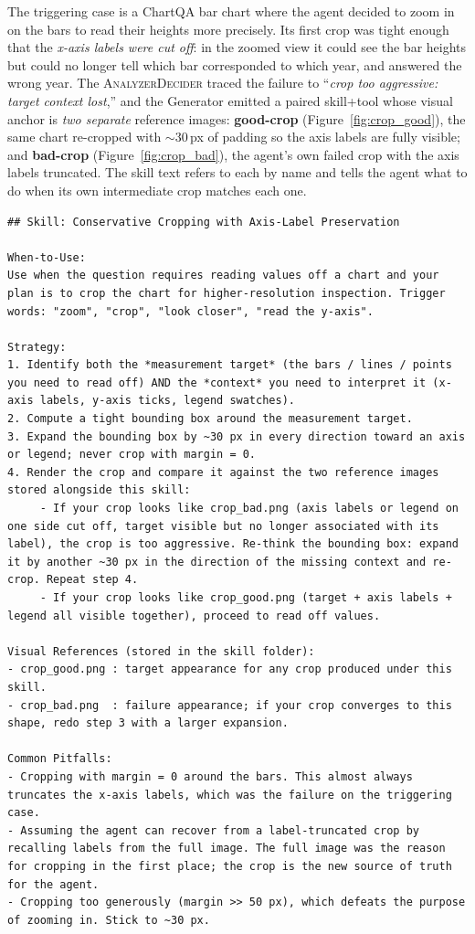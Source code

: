 The triggering case is a ChartQA bar chart where the agent decided to zoom in on the
bars to read their heights more precisely. Its first crop was tight enough that the
\emph{x-axis labels were cut off}: in the zoomed view it could see the bar heights but
could no longer tell which bar corresponded to which year, and answered the wrong year.
The \textsc{AnalyzerDecider} traced the failure to ``\textit{crop too aggressive: target
context lost},'' and the Generator emitted a paired skill+tool whose visual anchor is
\emph{two separate} reference images: \textbf{good-crop}
(Figure~\ref{fig:crop_good}), the same chart re-cropped with $\sim 30$\,px of padding so
the axis labels are fully visible; and \textbf{bad-crop}
(Figure~\ref{fig:crop_bad}), the agent's own failed crop with the axis labels truncated.
The skill text refers to each by name and tells the agent what to do when its own
intermediate crop matches each one.

\begin{tcolorbox}[
    title={\textbf{Generated skill (paired with the tool below; triggered on ChartQA)}},
    casebox
]
\begin{lstlisting}[style=mdskill]
## Skill: Conservative Cropping with Axis-Label Preservation

When-to-Use:
Use when the question requires reading values off a chart and your plan is to crop the chart for higher-resolution inspection. Trigger words: "zoom", "crop", "look closer", "read the y-axis".

Strategy:
1. Identify both the *measurement target* (the bars / lines / points you need to read off) AND the *context* you need to interpret it (x-axis labels, y-axis ticks, legend swatches).
2. Compute a tight bounding box around the measurement target.
3. Expand the bounding box by ~30 px in every direction toward an axis or legend; never crop with margin = 0.
4. Render the crop and compare it against the two reference images stored alongside this skill:
     - If your crop looks like crop_bad.png (axis labels or legend on one side cut off, target visible but no longer associated with its label), the crop is too aggressive. Re-think the bounding box: expand it by another ~30 px in the direction of the missing context and re-crop. Repeat step 4.
     - If your crop looks like crop_good.png (target + axis labels + legend all visible together), proceed to read off values.

Visual References (stored in the skill folder):
- crop_good.png : target appearance for any crop produced under this skill.
- crop_bad.png  : failure appearance; if your crop converges to this shape, redo step 3 with a larger expansion.

Common Pitfalls:
- Cropping with margin = 0 around the bars. This almost always truncates the x-axis labels, which was the failure on the triggering case.
- Assuming the agent can recover from a label-truncated crop by recalling labels from the full image. The full image was the reason for cropping in the first place; the crop is the new source of truth for the agent.
- Cropping too generously (margin >> 50 px), which defeats the purpose of zooming in. Stick to ~30 px.
\end{lstlisting}
\end{tcolorbox}

